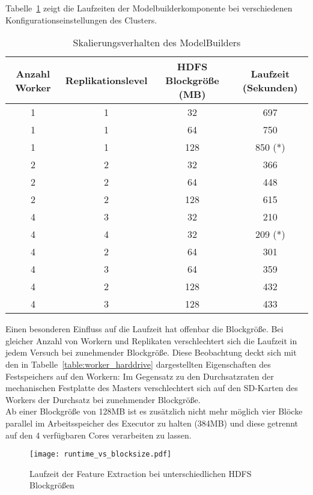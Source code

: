 Tabelle~\ref{table:scaling} zeigt die Laufzeiten der Modelbuilderkomponente bei verschiedenen Konfigurationseinstellungen des Clusters.

\begin{table}[ht]
	\centering %
	\begin{tabular}{c c c c} %
	\hline\hline %
	Anzahl Worker & Replikationslevel & HDFS Blockgröße (MB) & Laufzeit (Sekunden) \\ [0.5ex] %
	\hline %
	1 & 1 & 32 & 697 \\ %
	1 & 1 & 64 & 750 \\
	1 & 1 & 128 & 850 (*)\\
	2 & 2 & 32 & 366 \\
	2 & 2 & 64 & 448 \\
	2 & 2 & 128 & 615 \\
	4 & 3 & 32 & 210 \\
	4 & 4 & 32 & 209 (*)\\
	4 & 2 & 64 & 301 \\
	4 & 3 & 64 & 359 \\
	4 & 2 & 128 & 432 \\
	4 & 3 & 128 & 433 \\ [1ex] 
	\hline %
	\end{tabular}
	\caption{Skalierungsverhalten des ModelBuilders} %
	\label{table:scaling} %
\end{table}

Einen besonderen Einfluss auf die Laufzeit hat offenbar die Blockgröße. Bei gleicher Anzahl von Workern und Replikaten verschlechtert sich die Laufzeit in jedem Versuch bei zunehmender Blockgröße. Diese Beobachtung deckt sich mit den in Tabelle~\ref{table:worker_harddrive} dargestellten Eigenschaften des Festspeichers auf den Workern: 
Im Gegensatz zu den Durchsatzraten der mechanischen Festplatte des Masters verschlechtert sich auf den SD-Karten des Workers der Durchsatz bei zunehmender Blockgröße.\\
Ab einer Blockgröße von 128MB ist es zusätzlich nicht mehr möglich vier Blöcke parallel im Arbeitsspeicher des Executor zu halten (384MB) und diese getrennt auf den 4 verfügbaren Cores verarbeiten zu lassen.

\begin{figure}[ht!]
	\centering
  \texttt{[image: runtime\_vs\_blocksize.pdf]}
	\caption{Laufzeit der Feature Extraction bei unterschiedlichen HDFS Blockgrößen}
	\label{figure:runtime_vs_blocksize}
\end{figure}

